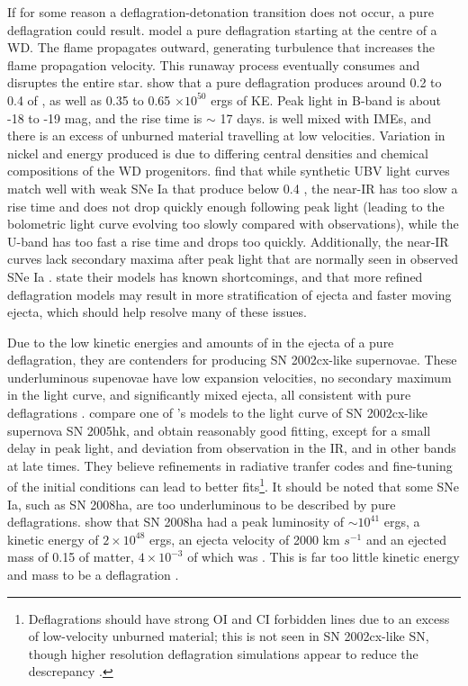 If for some reason a deflagration-detonation transition does not occur, a pure deflagration could result.  \cite{blin+06} model a pure deflagration starting at the centre of a {\Mchan} WD.  The flame propagates outward, generating turbulence that increases the flame propagation velocity.  This runaway process eventually consumes and disruptes the entire star.  \citeauthor{blin+06} show that a pure deflagration produces around 0.2 to 0.4 {\Msun} of {\Ni}, as well as 0.35 to 0.65 $\times 10^{50}$ ergs of KE.  Peak light in B-band is about -18 to -19 mag, and the rise time is $\sim$ 17 days.  {\Ni} is well mixed with IMEs, and there is an excess of unburned material travelling at low velocities.  Variation in nickel and energy produced is due to differing central densities and chemical compositions of the WD progenitors.  \citeauthor{blin+06} find that while synthetic UBV light curves match well with weak SNe Ia that produce below 0.4 {\Ni}, the near-IR has too slow a rise time and does not drop quickly enough following peak light (leading to the bolometric light curve evolving too slowly compared with observations), while the U-band has too fast a rise time and drops too quickly.  Additionally, the near-IR curves lack secondary maxima after peak light that are normally seen in observed SNe Ia \citep{blin+06,phil+07}.  \citeauthor{blin+06} state their models has known shortcomings, and that more refined deflagration models may result in more stratification of ejecta and faster moving ejecta, which should help resolve many of these issues.

Due to the low kinetic energies and amounts of {\Ni} in the ejecta of a pure deflagration, they are contenders for producing SN 2002cx-like supernovae.  These underluminous supenovae have low expansion velocities, no secondary maximum in the light curve, and significantly mixed ejecta, all consistent with pure deflagrations \citep{phil+07}.  \cite{phil+07} compare one of \cite{blin+06}'s models to the light curve of SN 2002cx-like supernova SN 2005hk, and obtain reasonably good fitting, except for a small delay in peak light, and deviation from observation in the IR, and in other bands at late times.  They believe refinements in radiative tranfer codes and fine-tuning of the initial conditions can lead to better fits\footnote{Deflagrations should have strong OI and CI forbidden lines due to an excess of low-velocity unburned material; this is not seen in SN 2002cx-like SN, though higher resolution deflagration simulations appear to reduce the descrepancy \citep{phil+07}.}.  It should be noted that some SNe Ia, such as SN 2008ha, are too underluminous to be described by pure deflagrations.  \cite{fole+09} show that SN 2008ha had a peak luminosity of $\sim 10^{41}$ ergs, a kinetic energy of $2 \times 10^{48}$ ergs, an ejecta velocity of 2000 km $s^{-1}$ and an ejected mass of 0.15 {\Msun} of matter, $4 \times 10^{-3}$ {\Msun} of which was {\Ni}.  This is far too little kinetic energy and mass to be a deflagration \citep{fole+09}.

